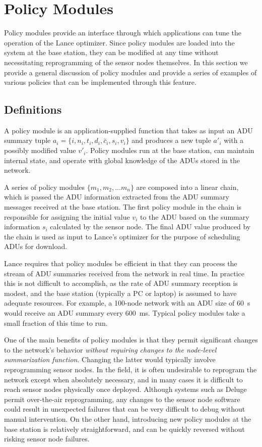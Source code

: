 \section{Policy Modules}
\label{lance-sec-policies}

Policy modules provide an interface through which applications can tune the
operation of the Lance optimizer. Since policy modules are loaded into the
system at the base station, they can be modified at any time without
necessitating reprogramming of the sensor nodes themselves. In this section
we provide a general discussion of policy modules and provide a series of
examples of various policies that can be implemented through this feature.

\subsection{Definitions}

A policy module is an application-supplied function that takes as input an
ADU summary tuple $a_i = \{ i, n_i, t_i, d_i, \bar{c}_i, s_i, v_i \}$ and
produces a new tuple $a'_i$ with a possibly modified value $v'_i$. Policy
modules run at the base station, can maintain internal state, and operate
with global knowledge of the ADUs stored in the network.

A series of policy modules $\{m_1, m_2, ... m_n\}$ are composed into a linear
chain, which is passed the ADU information extracted from the ADU summary
messages received at the base station. The first policy module in the chain
is responsible for assigning the initial value $v_i$ to the ADU based on the
summary information $s_i$ calculated by the sensor node. The final ADU value
produced by the chain is used as input to Lance's optimizer for the purpose
of scheduling ADUs for download.

Lance requires that policy modules be efficient in that they can process the
stream of ADU summaries received from the network in real time. In practice
this is not difficult to accomplish, as the rate of ADU summary reception is
modest, and the base station (typically a PC or laptop) is assumed to have
adequate resources. For example, a 100-node network with an ADU size of
60~s would receive an ADU summary every 600~ms. Typical policy modules
take a small fraction of this time to run.

One of the main benefits of policy modules is that they permit significant
changes to the network's behavior \textit{without requiring changes to the
node-level summarization function}. Changing the latter would typically
involve reprogramming sensor nodes. In the field, it is often undesirable to
reprogram the network except when absolutely necessary, and in many cases it
is difficult to reach sensor nodes physically once deployed. Although systems
such as Deluge~\cite{deluge} permit over-the-air reprogramming, any changes
to the sensor node software could result in unexpected failures that can be
very difficult to debug without manual intervention. On the other hand,
introducing new policy modules at the base station is relatively
straightforward, and can be quickly reversed without risking sensor node
failures.

